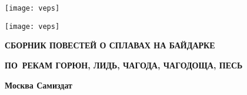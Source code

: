 \BgThispage %
\begin{titlepage}
	\newpage
	\begin{center}
		\huge \textbf \MyVarAuthorName
	\end{center}	
	\vspace{1.75cm}	
	\begin{center}
	\texttt{[image: veps]}
	\end{center}	
	\begin{center}
		\Huge{}
	\end{center}	
%
	\begin{center}
	\texttt{[image: veps]}
	\end{center}
%
	\begin{center}
		\small 
%	
		{
		\textbf{СБОРНИК ПОВЕСТЕЙ О СПЛАВАХ НА БАЙДАРКЕ}}
		
		{
		\textbf{ПО~РЕКАМ ГОРЮН, ЛИДЬ, ЧАГОДА, ЧАГОДОЩА, ПЕСЬ}}		
	\end{center}
%
	\vspace{\fill}	
	\begin{center}
		\small\textbf{
		Москва  \linebreak
		Самиздат}
	\end{center}	
\end{titlepage}